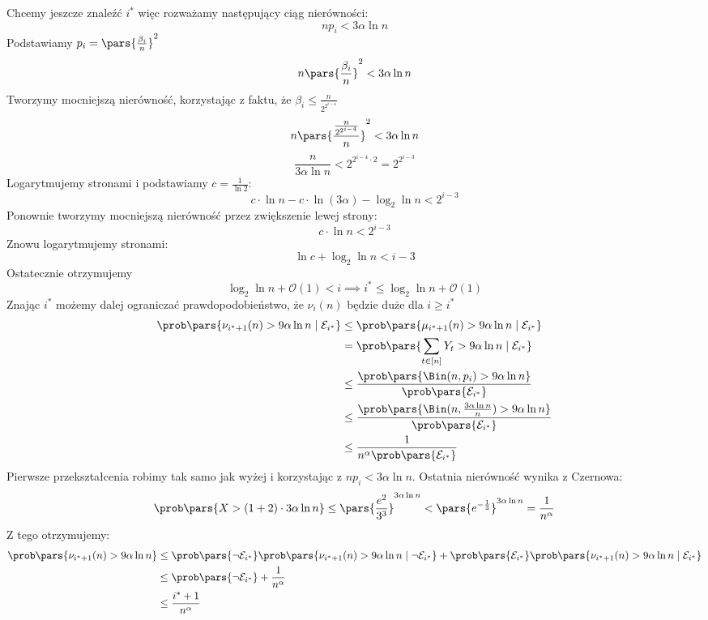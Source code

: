 Chcemy jeszcze znaleźć \( i^* \) więc rozważamy następujący ciąg nierówności:
\[
	np_i < 3\alpha\ln n
\]
Podstawiamy \( p_i = \pars{\frac{\beta_i}{n}}^2 \)
\[
	n\pars{\frac{\beta_i}{n}}^2 < 3\alpha\ln n
\]
Tworzymy mocniejszą nierówność, korzystając z faktu, że \( \beta_i \leq \frac{n}{2^{2^{i-4}}} \)
\[
	n\pars{\frac{\frac{n}{2^{2^{i-4}}}}{n}}^2 < 3\alpha\ln n
\]
\[
	\frac{n}{3\alpha\ln n} < 2^{2^{i-4} \cdot 2} = 2^{2^{i-3}}
\]
Logarytmujemy stronami i podstawiamy \( c = \frac{1}{\ln2} \):
\[
	c \cdot \ln n - c \cdot \ln(3\alpha) - \log_2 \ln n < 2^{i-3}
\]
Ponownie tworzymy mocniejszą nierówność przez zwiększenie lewej strony:
\[
	c \cdot \ln n < 2^{i-3}
\]
Znowu logarytmujemy stronami:
\[
	\ln c + \log_2 \ln n < i-3
\]
Ostatecznie otrzymujemy
\[
	\log_2 \ln n + \mathcal{O}(1) < i \implies i^* \leq \log_2 \ln n + \mathcal{O}(1)
\]
Znając \( i^* \) możemy dalej ograniczać prawdopodobieństwo, że \( \nu_i(n) \) będzie duże dla \( i \geq i^* \)
\begin{align*}
	\prob\pars{\nu_{i^*+1}(n) > 9\alpha\ln n \mid \mathcal{E}_{i^*}} & \leq \prob\pars{\mu_{i^*+1}(n) > 9\alpha\ln n \mid \mathcal{E}_{i^*}}                                 \\
	                                                                 & = \prob\pars{\sum_{t \in [n]} Y_t > 9\alpha\ln n \mid \mathcal{E}_{i^*}}                              \\
	                                                                 & \leq \frac{\prob\pars{\Bin(n, p_i) > 9\alpha\ln n}}{\prob\pars{\mathcal{E}_{i^*}}}                    \\
	                                                                 & \leq \frac{\prob\pars{\Bin(n, \frac{3\alpha\ln n}{n}) > 9\alpha\ln n}}{\prob\pars{\mathcal{E}_{i^*}}} \\
	                                                                 & \leq \frac{1}{n^{\alpha}\prob\pars{\mathcal{E}_{i^*}}}
\end{align*}
Pierwsze przekształcenia robimy tak samo jak wyżej i korzystając z \( np_i < 3\alpha\ln n \). Ostatnia nierówność wynika z Czernowa:
\[
	\prob\pars{X > (1 + 2) \cdot 3\alpha\ln n} \leq \pars{\frac{e^2}{3^3}}^{3\alpha\ln n} < \pars{e^{-\frac{1}{3}}}^{3\alpha\ln n} = \frac{1}{n^{\alpha}}
\]
Z tego otrzymujemy:
\begin{align*}
	\prob\pars{\nu_{i^*+1}(n) > 9\alpha\ln n} & \leq \prob\pars{\neg\mathcal{E}_{i^*}} \prob\pars{\nu_{i^*+1}(n) > 9\alpha\ln n \mid \neg\mathcal{E}_{i^*}} + \prob\pars{\mathcal{E}_{i^*}} \prob\pars{\nu_{i^*+1}(n) > 9\alpha\ln n \mid \mathcal{E}_{i^*}} \\
	                                          & \leq \prob\pars{\neg\mathcal{E}_{i^*}} + \frac{1}{n^{\alpha}}                                                                                                                                                \\
	                                          & \leq \frac{i^* + 1}{n^{\alpha}}
\end{align*}
